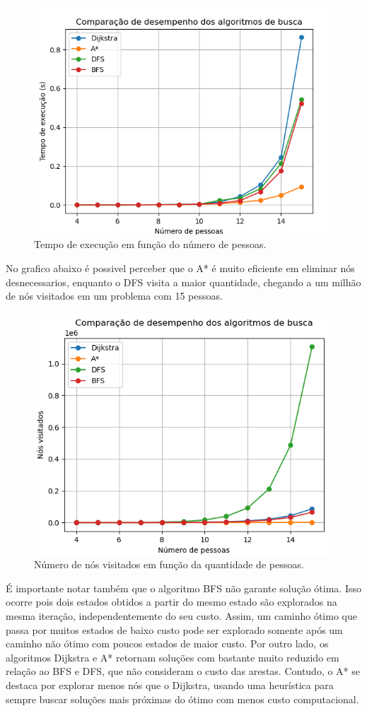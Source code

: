 \documentclass[12pt,a4paper]{article}
\begin{document}
\begin{figure}[H]
    \centering
    \includegraphics[width=0.8\linewidth]{execution_time.png}
    \caption{Tempo de execução em função do número de pessoas.}
    \label{fig:execution_time}
\end{figure}

No grafico abaixo é possivel perceber que o A* é muito eficiente em eliminar nós desnecessarios, enquanto o DFS visita a maior quantidade, chegando a um milhão de nós visitados em um problema com 15 pessoas.

\begin{figure}[H]
    \centering
    \includegraphics[width=0.8\linewidth]{node_visited.png}
    \caption{Número de nós visitados em função da quantidade de pessoas.}
    \label{fig:node_visited}
\end{figure}

É importante notar também que o algoritmo BFS não garante solução ótima. Isso ocorre pois dois estados obtidos a partir do mesmo estado são explorados na mesma iteração, independentemente do seu custo. Assim, um caminho ótimo que passa por muitos estados de baixo custo pode ser explorado somente após um caminho não ótimo com poucos estados de maior custo.  
Por outro lado, os algoritmos Dijkstra e A* retornam soluções com bastante muito reduzido em relação ao BFS e DFS, que não consideram o custo das arestas. Contudo, o A* se destaca por explorar menos nós que o Dijkstra, usando uma heurística para sempre buscar soluções mais próximas do ótimo com menos custo computacional.
\end{document}

